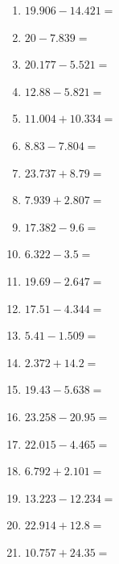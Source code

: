 \documentclass[12pt]{article}
\begin{document}
\begin{enumerate}
\item \large $ 19.906 - 14.421 = $ \vspace{1.5cm}
\item \large $ 20 - 7.839 = $ \vspace{1.5cm}
\item \large $ 20.177 - 5.521 = $ \vspace{1.5cm}
\item \large $ 12.88 - 5.821 = $ \vspace{1.5cm}
\item \large $ 11.004 + 10.334 = $ \vspace{1.5cm}
\newpage
\item \large $ 8.83 - 7.804 = $ \vspace{1.5cm}
\item \large $ 23.737 + 8.79 = $ \vspace{1.5cm}
\item \large $ 7.939 + 2.807 = $ \vspace{1.5cm}
\item \large $ 17.382 - 9.6 = $ \vspace{1.5cm}
\item \large $ 6.322 - 3.5 = $ \vspace{1.5cm}
\item \large $ 19.69 - 2.647 = $ \vspace{1.5cm}
\item \large $ 17.51 - 4.344 = $ \vspace{1.5cm}
\item \large $ 5.41 - 1.509 = $ \vspace{1.5cm}
\item \large $ 2.372 + 14.2 = $ \vspace{1.5cm}
\item \large $ 19.43 - 5.638 = $ \vspace{1.5cm}
\newpage
\item \large $ 23.258 - 20.95 = $ \vspace{1.5cm}
\item \large $ 22.015 - 4.465 = $ \vspace{1.5cm}
\item \large $ 6.792 + 2.101 = $ \vspace{1.5cm}
\item \large $ 13.223 - 12.234 = $ \vspace{1.5cm}
\item \large $ 22.914 + 12.8 = $ \vspace{1.5cm}
\item \large $ 10.757 + 24.35 = $ \vspace{1.5cm}

\end{enumerate}
\end{document}
